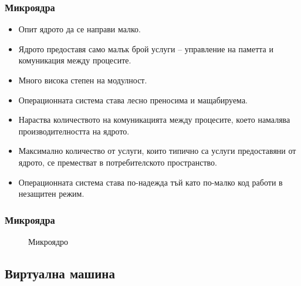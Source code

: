 \documentclass[ignorenonframetext, hyperref=unicode]{beamer}
\begin{document}
\begin{frame}
\frametitle{Микроядра}
\begin{itemize}
\item Опит ядрото да се направи малко.
\item Ядрото предоставя само малък брой услуги -- управление на паметта и
комуникация между процесите.
\item Много висока степен на модулност.
\item Операционната система става лесно преносима и мащабируема.
\item Нараства количеството на комуникацията между процесите, което намалява
производителността на ядрото.
\item Максимално количество от услуги, които типично са услуги предоставяни от
ядрото, се преместват в потребителското пространство.
\item Операционната система става по-надежда тъй като по-малко код работи в
незащитен режим.
\end{itemize}
\end{frame}

\begin{frame}
\frametitle{Микроядра}
\begin{figure}[h]
\center
{}
\caption{Микроядро}
\end{figure}
\end{frame}


\subsection{Виртуална машина}
\end{document}
